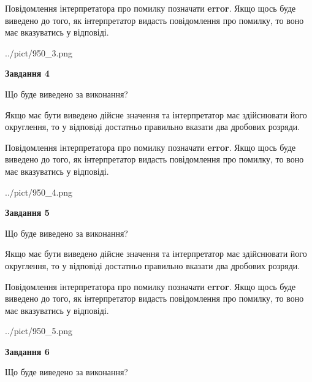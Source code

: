 \documentclass[12pt, ukrainian]{article}
\begin{document}
{\begin {Large}
Повідомлення інтерпретатора про помилку позначати \textbf{error}.
Якщо щось буде виведено до того, як інтерпретатор видасть повідомлення про помилку, 
то воно має вказуватись у відповіді. \par

\begin{center}
	{../pict/950_3.png}
\end{center}
\newpage

{\begin {center}\textbf{Завдання 4}\end {center}}\par
Що буде виведено за виконання? \par

Якщо має бути виведено дійсне значення та інтерпретатор має здійснювати його округлення, 
то у відповіді достатньо правильно вказати два дробових розряди.

Повідомлення інтерпретатора про помилку позначати \textbf{error}.
Якщо щось буде виведено до того, як інтерпретатор видасть повідомлення про помилку, 
то воно має вказуватись у відповіді. \par

\begin{center}
	{../pict/950_4.png}
\end{center}
\newpage

{\begin {center}\textbf{Завдання 5}\end {center}}\par
Що буде виведено за виконання? \par

Якщо має бути виведено дійсне значення та інтерпретатор має здійснювати його округлення, 
то у відповіді достатньо правильно вказати два дробових розряди.

Повідомлення інтерпретатора про помилку позначати \textbf{error}.
Якщо щось буде виведено до того, як інтерпретатор видасть повідомлення про помилку, 
то воно має вказуватись у відповіді. \par

\begin{center}
	{../pict/950_5.png}
\end{center}
\newpage

{\begin {center}\textbf{Завдання 6}\end {center}}\par
Що буде виведено за виконання? \par


\end{Large}}
\end{document}
